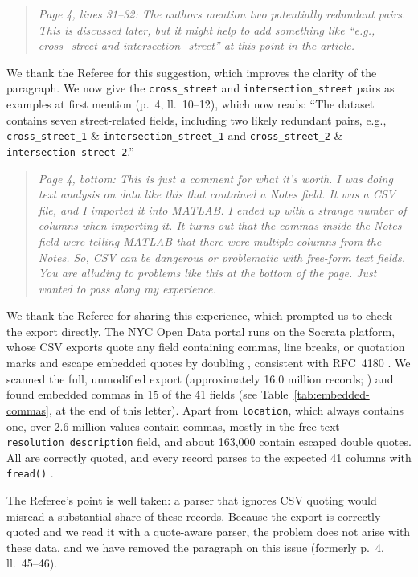 \documentclass[12pt]{article}
\newenvironment{comment}
{\begin{quotation}\noindent\small\itshape\color{darkblue}\ignorespaces}
{\end{quotation}}
\begin{document}
\FloatBarrier
\begin{comment}
Page 4, lines 31--32: The authors mention two potentially
redundant pairs. This is discussed later, but it might help to add
something like ``e.g., cross\_street and intersection\_street'' at this
point in the article.
\end{comment}

We thank the Referee for this suggestion, which improves the clarity of
the paragraph. We now give the \texttt{cross\_street} and
\texttt{intersection\_street} pairs as examples at first mention
(p.~4, ll.~10--12), which now reads: ``The dataset contains seven
street-related fields, including two likely redundant pairs, e.g.,
\texttt{cross\_street\_1} \& \texttt{intersection\_\allowbreak street\_1}
and \texttt{cross\_street\_2} \& \texttt{intersection\_\allowbreak street\_2}.''

\FloatBarrier
\begin{comment}
Page 4, bottom: This is just a comment for what it's worth.
I was doing text analysis on data like this that contained a Notes
field. It was a CSV file, and I imported it into MATLAB. I ended up
with a strange number of columns when importing it. It turns out that
the commas inside the Notes field were telling MATLAB that there were
multiple columns from the Notes. So, CSV can be dangerous or
problematic with free-form text fields. You are alluding to problems
like this at the bottom of the page. Just wanted to pass along my
experience.
\end{comment}

We thank the Referee for sharing this experience, which prompted us to
check the export directly. The NYC Open Data portal runs on the Socrata
platform, whose CSV exports quote any field containing commas, line
breaks, or quotation marks and escape embedded quotes by doubling
\citep{socrata_csv}, consistent with RFC~4180 \citep{rfc4180}. We scanned
the full, unmodified export (approximately 16.0 million records;
\citealp{nyc311_data}) and found embedded commas in 15 of the 41 fields
(see Table~\ref{tab:embedded-commas}, at the end of this letter). Apart from
\texttt{location}, which always contains one, over 2.6 million values
contain commas, mostly in the free-text \texttt{resolution\_description}
field, and about 163{,}000 contain escaped double quotes. All are correctly
quoted, and every record parses to the expected 41 columns with
\texttt{fread()} \citep{datatable2025}.

The Referee's point is well taken: a parser that ignores CSV quoting would
misread a substantial share of these records. Because the export is
correctly quoted and we read it with a quote-aware parser, the problem
does not arise with these data, and we have removed the paragraph on this
issue (formerly p.~4, ll.~45--46).
\end{document}
